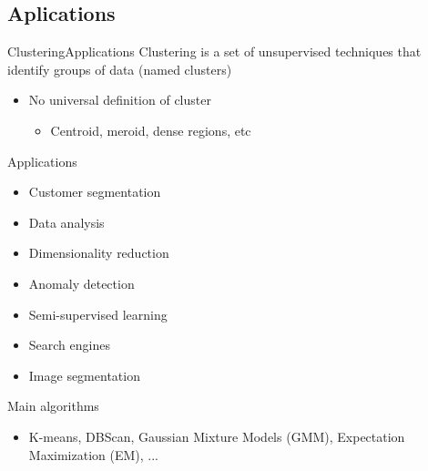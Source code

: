 \documentclass[10pt,compress]{beamer} %
\begin{document}
\subsection{Aplications}
\begin{frame}{Clustering}{Applications}
	Clustering is a set of unsupervised techniques that identify groups of data (named \alert{clusters})
    \begin{itemize}
        \item No universal definition of cluster
        \begin{itemize}
            \item Centroid, meroid, dense regions, etc
        \end{itemize}
    \end{itemize}

    Applications
	\begin{itemize}
		\item Customer segmentation
           \item Data analysis
           \item Dimensionality reduction
           \item Anomaly detection
           \item Semi-supervised learning
           \item Search engines
           \item Image segmentation
	\end{itemize}

    Main algorithms
	\begin{itemize}
		\item K-means, DBScan, Gaussian Mixture Models (GMM), Expectation Maximization (EM), ...
	\end{itemize}
\end{frame}
\end{document}
